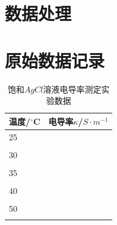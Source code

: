 \documentclass[a4paper]{article}
\begin{document}
\section{数据处理}


\newpage
\section{原始数据记录}
\begin{table}[H]
	\caption{饱和$AgCl$溶液电导率测定实验数据}
	\begin{center}
		\begin{tabular}{l|l}
			\hline
			温度/$^\circ$C \quad\quad\quad\quad\quad 	&电导率$\kappa$/$S\cdot m^{-1}$\quad\quad\quad\quad\quad\\
			\hline
			25&\\
			&\\
			\hline
			30&\\
			&\\
			\hline
			35&\\
			&\\
			\hline
			40&\\
			&\\
			\hline
			50&\\
			&\\
			\hline
		 \end{tabular}
	\end{center}
\end{table}
\end{document}

